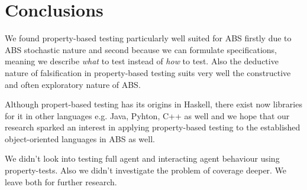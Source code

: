 \section{Conclusions}
\label{sec:conclusions}

We found property-based testing particularly well suited for ABS firstly due to ABS stochastic nature and second because we can formulate specifications, meaning we describe \textit{what} to test instead of \textit{how} to test. Also the deductive nature of falsification in property-based testing suits very well the constructive and often exploratory nature of ABS. 

Although propert-based testing has its origins in Haskell, there exist now libraries for it in other languages e.g. Java, Pyhton, C++ as well and we hope that our research sparked an interest in applying property-based testing to the established object-oriented languages in ABS as well.

We didn't look into testing full agent and interacting agent behaviour using property-tests. Also we didn't investigate the problem of coverage deeper. We leave both for further research.